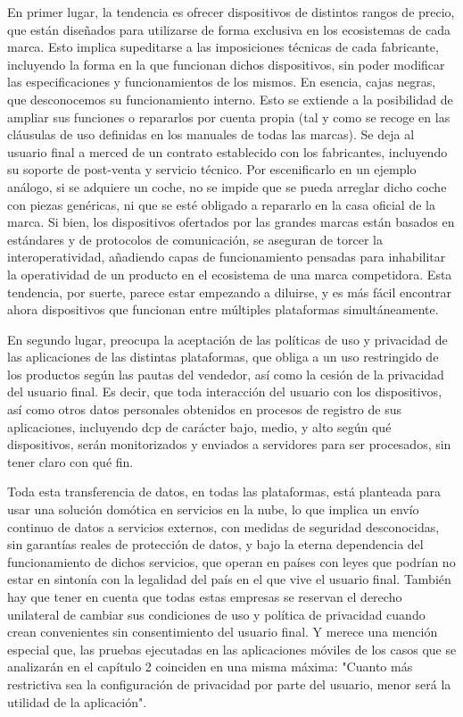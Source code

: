 En primer lugar, la tendencia es ofrecer dispositivos de distintos rangos de precio, que están diseñados para utilizarse de forma exclusiva en los ecosistemas de cada marca. Esto implica supeditarse a las imposiciones técnicas de cada fabricante, incluyendo la forma en la que funcionan dichos dispositivos, sin poder modificar las especificaciones y funcionamientos de los mismos. En esencia, cajas negras, que desconocemos su funcionamiento interno. Esto se extiende a la posibilidad de ampliar sus funciones o repararlos por cuenta propia (tal y como se recoge en las cláusulas de uso definidas en los manuales de todas las marcas). Se deja al usuario final a merced de un contrato establecido con los fabricantes, incluyendo su soporte de post-venta y servicio técnico. Por escenificarlo en un ejemplo análogo, si se adquiere un coche, no se impide que se pueda arreglar dicho coche con piezas genéricas, ni que se esté obligado a repararlo en la casa oficial de la marca. Si bien, los dispositivos ofertados por las grandes marcas están basados en estándares y de protocolos de comunicación, se aseguran de torcer la interoperatividad, añadiendo capas de funcionamiento pensadas para inhabilitar la operatividad de un producto en el ecosistema de una marca competidora. Esta tendencia, por suerte, parece estar empezando a diluirse, y es más fácil encontrar ahora dispositivos que funcionan entre múltiples plataformas simultáneamente.

\vspace{1cm}

En segundo lugar, preocupa la aceptación de las políticas de uso y privacidad de las aplicaciones de las distintas plataformas, que obliga a un uso restringido de los productos según las pautas del vendedor, así como la cesión de la privacidad del usuario final. Es decir, que toda interacción del usuario con los dispositivos, así como otros datos personales obtenidos en procesos de registro de sus aplicaciones, incluyendo \gls{dcp} de carácter bajo, medio, y alto según qué dispositivos, serán monitorizados y enviados a servidores para ser procesados, sin tener claro con qué fin.

\vspace{1cm}

Toda esta transferencia de datos, en todas las plataformas, está planteada para usar una solución domótica en servicios en la nube, lo que implica un envío continuo de datos a servicios externos, con medidas de seguridad desconocidas, sin garantías reales de protección de datos, y bajo la eterna dependencia del funcionamiento de dichos servicios, que operan en países con leyes que podrían no estar en sintonía con la legalidad del país en el que vive el usuario final. También hay que tener en cuenta que todas estas empresas se reservan el derecho unilateral de cambiar sus condiciones de uso y política de privacidad cuando crean convenientes sin consentimiento del usuario final. Y merece una mención especial que, las pruebas ejecutadas en las aplicaciones móviles de los casos que se analizarán en el capítulo 2 coinciden en una misma máxima: "Cuanto más restrictiva sea la configuración de privacidad por parte del usuario, menor será la utilidad de la aplicación".

